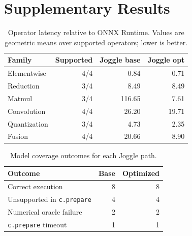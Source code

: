 \section{Supplementary Results}
\label{app:results}

\begin{table}[H]
  \caption{Operator latency relative to ONNX Runtime. Values are geometric
  means over supported operators; lower is better.}
  \label{tab:operator-detail}
  \small
  \setlength{\tabcolsep}{4pt}
  \begin{tabular}{@{}lrrr@{}}
    \toprule
    Family & Supported & Joggle base & Joggle opt \\
    \midrule
    Elementwise  & 4/4 & 0.84 & 0.71 \\
    Reduction    & 3/4 & 8.49 & 8.49 \\
    Matmul       & 3/4 & 116.65 & 7.61 \\
    Convolution  & 4/4 & 26.20 & 19.71 \\
    Quantization & 3/4 & 4.73 & 2.35 \\
    Fusion       & 4/4 & 20.66 & 8.90 \\
    \bottomrule
  \end{tabular}
\end{table}

\begin{table}[H]
  \caption{Model coverage outcomes for each Joggle path.}
  \label{tab:model-failures}
  \small
  \setlength{\tabcolsep}{4pt}
  \begin{tabular}{@{}lrr@{}}
    \toprule
    Outcome & Base & Optimized \\
    \midrule
    Correct execution & 8 & 8 \\
    Unsupported in \texttt{c.prepare} & 4 & 4 \\
    Numerical oracle failure & 2 & 2 \\
    \texttt{c.prepare} timeout & 1 & 1 \\
    \bottomrule
  \end{tabular}
\end{table}
